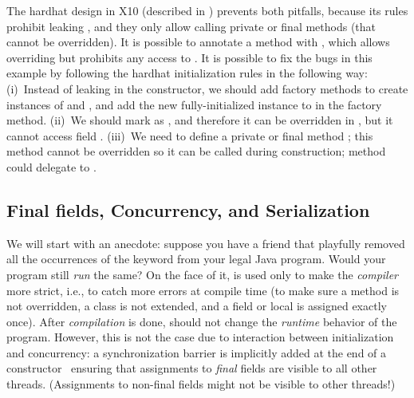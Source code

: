The hardhat design in X10 (described in )
    prevents both pitfalls,
    because its rules prohibit leaking \this,
    and they only allow calling private or final methods (that cannot be overridden).
It is possible to annotate a method with ,
    which allows overriding but prohibits any access to \this.
It is possible to fix the bugs in this example by following the hardhat initialization rules
    in the following way:
    (i)~Instead of leaking \this in the constructor,
        we should add factory methods to create instances of  and ,
        and add the new fully-initialized instance to  in the factory method.
    (ii)~We should mark  as ,
        and therefore it can be overridden in , but it cannot access field .
    (iii)~We need to define a private or final method ;
        this method cannot be overridden so it can be called during construction;
        method  could delegate to .



\subsection{Final fields, Concurrency, and Serialization}
\label{Section:FinalFields}
We will start with an anecdote:
    suppose you have a friend that
    playfully removed all the occurrences of the  keyword
    from your legal Java program.
Would your program still \emph{run} the same?
On the face of it,  is used only to make the \emph{compiler} more {strict},
    i.e., to catch more errors at compile time
    (to make sure a method is not overridden, a class is not extended, and a field or local
        is assigned exactly once).
After \emph{compilation} is done,  should not change the \emph{runtime} behavior of the program.
However, this is not the case due to interaction between initialization and concurrency:
    a synchronization barrier is implicitly added
    at the end of a constructor~\cite{JSR133}
    ensuring that assignments to \emph{final} fields are visible to all other threads.
(Assignments to non-final fields might not be visible to other threads!)

